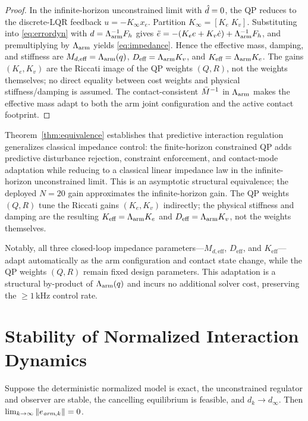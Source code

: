 \begin{proof}
In the infinite-horizon unconstrained limit with $\hat{d}=0$, the QP reduces to
the discrete-LQR feedback $u=-K_\infty x_e$. Partition
$K_\infty=[K_e\;K_v]$. Substituting into
\eqref{eq:errordyn} with
$d=\Lambda_{\text{arm}}^{-1}F_h$ gives
$\ddot e=-(K_e e+K_v\dot e)+\Lambda_{\text{arm}}^{-1}F_h$, and premultiplying by $\Lambda_{\text{arm}}$
yields \eqref{eq:impedance}. Hence the effective mass, damping, and stiffness
are $M_{d,\text{eff}}=\Lambda_{\text{arm}}(q)$, $D_{\text{eff}}=\Lambda_{\text{arm}} K_v$, and
$K_{\text{eff}}=\Lambda_{\text{arm}} K_e$.
The gains $(K_e,K_v)$ are the Riccati image of the QP weights $(Q,R)$, not
the weights themselves; no direct equality between cost weights and physical
stiffness/damping is assumed.
The contact-consistent $\bar{M}^{-1}$ in $\Lambda_{\text{arm}}$ makes the effective mass adapt to
both the arm joint configuration and the active contact footprint.
\end{proof}

Theorem~\ref{thm:equivalence} establishes that predictive interaction
regulation generalizes classical impedance control: the finite-horizon
constrained QP adds predictive disturbance rejection, constraint enforcement,
and contact-mode adaptation while reducing to a classical linear impedance
law in the infinite-horizon unconstrained limit.
This is an asymptotic structural equivalence; the deployed
$N=20$ gain approximates the infinite-horizon gain.
The QP weights $(Q,R)$ tune the Riccati gains $(K_e,K_v)$ indirectly; the
physical stiffness and damping are the resulting
$K_{\text{eff}}=\Lambda_{\text{arm}} K_e$ and $D_{\text{eff}}=\Lambda_{\text{arm}} K_v$, not the weights
themselves.

Notably, all three closed-loop impedance parameters---$M_{d,\text{eff}}$,
$D_{\text{eff}}$, and $K_{\text{eff}}$---adapt automatically as the arm
configuration and contact state change, while the QP weights $(Q,R)$ remain
fixed design parameters.
This adaptation is a structural by-product of $\Lambda_{\text{arm}}(q)$ and incurs no
additional solver cost, preserving the ${\geq}1$\,kHz control rate.

\section{Stability of Normalized Interaction Dynamics}\label{sec:stability}

\begin{theorem}\label{thm:zss}
Suppose the deterministic normalized model is exact, the unconstrained
regulator and observer are stable, the cancelling equilibrium is feasible,
and $d_k\to d_\infty$. Then
$\lim_{k\to\infty}\|e_{\emph{arm},k}\|=0$.
\end{theorem}

